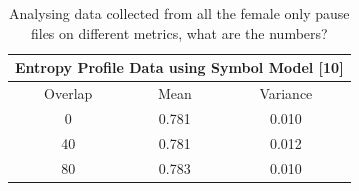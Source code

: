 \begin{table}[htp]
	\begin{center}
	\begin{tabular}{|c|c|c|}
		\hline
		\multicolumn{3}{|c|}{Entropy Profile Data using Symbol Model [10]} \\%
		\hline
		{\small Overlap} & {\small Mean} & {\footnotesize Variance} \\
		\hline \hline
		0 & 0.781 & 0.010 \\
		40 & 0.781 & 0.012 \\
		80 & 0.783 & 0.010 \\
		\hline   
	\end{tabular}
	\label{tab:2}
	\caption{Analysing data collected from all the female only pause files on different metrics, what are the numbers?}
	\end{center}
\end{table}%
